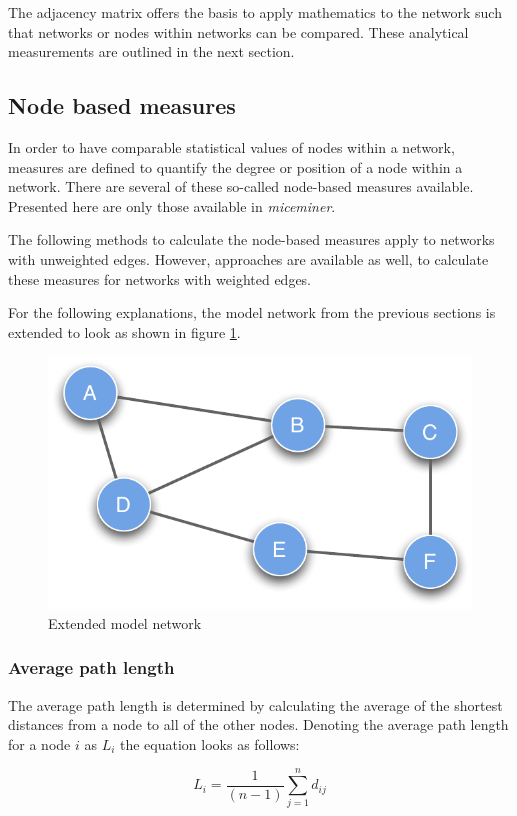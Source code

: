 The adjacency matrix offers the basis to apply mathematics to the network such that networks or nodes within networks can be compared. These analytical measurements are outlined in the next section.

\subsection{Node based measures}
\label{subsec:node_based}

In order to have comparable statistical values of nodes within a network, measures are defined to quantify the degree or position of a node within a network. There are several of these so-called node-based 
measures available. Presented here are only those available in \textit{miceminer}.

The following methods to calculate the node-based measures apply to networks with unweighted edges. However, approaches are available as well, to calculate these measures for networks with weighted edges\citep{bocaletti:06}. 

For the following explanations, the model network from the previous sections is extended to look as shown in figure \ref{fig:extended_network}.
\begin{figure}[!htpb]
\begin{center}
  \includegraphics[width=.45\textwidth]{assets/pdf/graph_undirected_node_based.pdf}
  \caption{Extended model network}
  \label{fig:extended_network}
\end{center}
\end{figure}    

\subsubsection{Average path length}

The average path length is determined by calculating the average of the shortest distances from a node to all of the other nodes. Denoting the average path length for a node $i$ as $L_i$ the equation looks as follows:

\begin{equation}
L_i = \frac{1}{(n-1)}\sum^n_{j=1} d_{ij}
\label{eq:average_path_lenght}
\end{equation}

